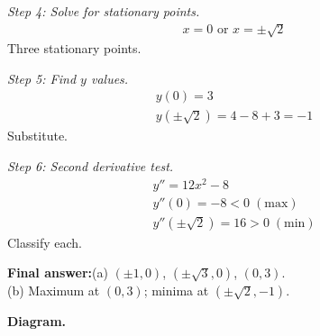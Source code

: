 \documentclass[11pt]{article}
\begin{document}
\textit{Step 4: Solve for stationary points.}
\[\begin{gathered}
x = 0 \text{ or } x = \pm\sqrt{2}
\end{gathered}\]
Three stationary points.

\textit{Step 5: Find \( y \) values.}
\[\begin{gathered}
y(0) = 3 \\ y(\pm\sqrt{2}) = 4 - 8 + 3 = -1
\end{gathered}\]
Substitute.

\textit{Step 6: Second derivative test.}
\[\begin{gathered}
y'' = 12x^2 - 8 \\ y''(0) = -8 < 0\; (\text{max}) \\ y''(\pm\sqrt{2}) = 16 > 0\; (\text{min})
\end{gathered}\]
Classify each.

\begin{answerbox}
\textbf{Final answer:}\quad (a) \(\displaystyle  (\pm 1, 0) \), \(\displaystyle  (\pm\sqrt{3}, 0) \), \(\displaystyle  (0, 3) \). \\[3pt]  (b) Maximum at \(\displaystyle  (0, 3) \); minima at \(\displaystyle  (\pm\sqrt{2}, -1) \).
\end{answerbox}
\textbf{Diagram.}
\end{document}
